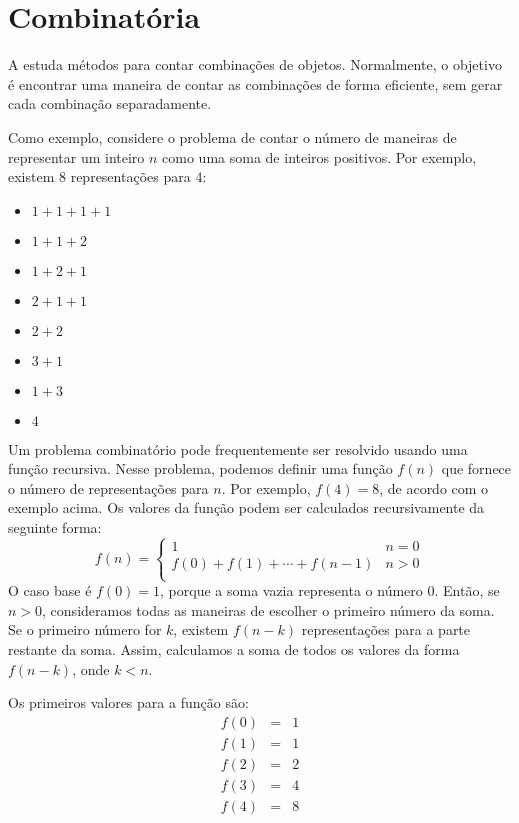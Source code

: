 \chapter{Combinatória}


A  estuda métodos para contar
combinações de objetos.
Normalmente, o objetivo é encontrar uma maneira de
contar as combinações de forma eficiente,
sem gerar cada combinação separadamente.

Como exemplo, considere o problema
de contar o número de maneiras de
representar um inteiro $n$ como uma soma de inteiros positivos.
Por exemplo, existem 8 representações
para $4$:
\begin{multicols}{2}
\begin{itemize}
\item $1+1+1+1$
\item $1+1+2$
\item $1+2+1$
\item $2+1+1$
\item $2+2$
\item $3+1$
\item $1+3$
\item $4$
\end{itemize}
\end{multicols}

Um problema combinatório pode frequentemente ser resolvido
usando uma função recursiva.
Nesse problema, podemos definir uma função $f(n)$
que fornece o número de representações para $n$.
Por exemplo, $f(4)=8$, de acordo com o exemplo acima.
Os valores da função
podem ser calculados recursivamente da seguinte forma:
\begin{equation*}
    f(n) = \begin{cases}
               1               & n = 0\\
               f(0)+f(1)+\cdots+f(n-1) & n > 0\\
           \end{cases}
\end{equation*}
O caso base é $f(0)=1$,
porque a soma vazia representa o número 0.
Então, se $n>0$, consideramos todas as maneiras de
escolher o primeiro número da soma.
Se o primeiro número for $k$,
existem $f(n-k)$ representações
para a parte restante da soma.
Assim, calculamos a soma de todos os valores
da forma $f(n-k)$, onde $k<n$.

Os primeiros valores para a função são:
\[
\begin{array}{lcl}
f(0) & = & 1 \\
f(1) & = & 1 \\
f(2) & = & 2 \\
f(3) & = & 4 \\
f(4) & = & 8 \\
\end{array}
\]

